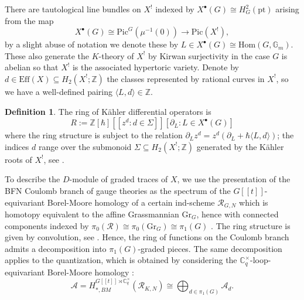 \documentclass[reqno]{amsart}
\numberwithin{equation}{section}
\numberwithin{equation}{section}
\numberwithin{equation}{section}
\theoremstyle{definition}
\newtheorem{defn}[thm]{Definition}
\theoremstyle{remark}
\theoremstyle{remark}
\begin{document}
There are tautological line bundles on $X^!$ indexed by $X^\bullet(G) \cong H^2_G(\mathrm{pt})$ arising from the map
\begin{equation}
    X^\bullet(G) \cong \mathrm{Pic}^G (\mu^{-1}(0)) \to \mathrm{Pic}(X^!),
\end{equation} by a slight abuse of notation we denote these by $L \in X^\bullet (G) \cong \mathrm{Hom}(G, \mathbb{G}_m)$. These also generate the $K$-theory of $X^!$ by Kirwan surjectivity \cite[Section 2.3]{smirnov-zhou} in the case $G$ is abelian so that $X^!$ is the associated hypertoric variety. Denote by $d \in \mathrm{Eff}(X) \subseteq H_2(X^!;\mathbb{Z})$ the classes represented by rational curves in $X^!$, so we have a well-defined pairing $\langle L, d \rangle \in \mathbb{Z}$.

\begin{defn}
    The ring of K\"ahler differential operators is
    \begin{equation}
        R := \mathbb{Z}[\hbar][\![z^d : d \in \Sigma]\!][ \partial_L : L \in X^\bullet (G)]
    \end{equation}
    where the ring structure is subject to the relation $\partial_L z^d = z^d (\partial_L  + \hbar \langle L, d \rangle)$; the indices $d$ range over the submonoid $\Sigma \subseteq H_2(X^!;\mathbb{Z})$ generated by the K\"ahler roots of $X^!$, see \cite[Definition 2.21]{bai-lee}. 
\end{defn}

To describe the $D$-module of graded traces of $X$, we use the presentation of the BFN Coulomb branch of gauge theories as the spectrum of the $G[\![t]\!]$-equivariant Borel-Moore homology of a certain ind-scheme $\mathcal{R}_{G, N}$ which is homotopy equivalent to the affine Grassmannian $\mathrm{Gr}_G$, hence with connected components indexed by $\pi_0(\mathcal{R}) \cong \pi_0(\mathrm{Gr}_G) \cong \pi_1(G)$ \cite[3(v)]{BFN2}. The ring structure is given by convolution, see \cite[Section 3(iv), Remark 3.14]{BFN2}. Hence, the ring of functions on the Coulomb branch admits a decomposition into $\pi_1(G)$-graded pieces. The same decomposition applies to the quantization, which is obtained by considering the $\mathbb{C}^\times_q$-loop-equivariant Borel-Moore homology \cite[Definition 3.13]{BFN2}:
\begin{equation}
    \mathcal{A}=  H_{*, BM}^{G[\![t]\!] \rtimes \mathbb{C}^\times_q} (\mathcal{R}_{K, N}) \cong \bigoplus_{d \in \pi_1(G)} \mathcal{A}_d.
\end{equation}
\end{document}
